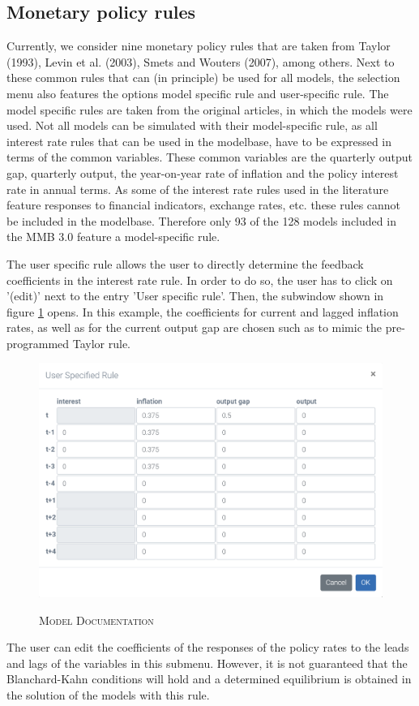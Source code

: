 \subsection*{Monetary policy rules}
Currently, we consider nine monetary policy rules that are taken from Taylor (1993), Levin et al. (2003), Smets and Wouters (2007), among others. Next to these common rules that can (in principle) be used for all models, the selection menu also features the options model specific rule and user-specific rule. 
The model specific rules are taken from the original articles, in which the models were used. Not all models can be simulated with their model-specific rule, as all interest rate rules that can be used in the modelbase, have to be expressed in terms of the common variables. These common variables are the quarterly output gap, quarterly output, the year-on-year rate of inflation and the policy interest rate in annual terms. As some of the interest rate rules used in the literature feature responses to financial indicators, exchange rates, etc. these rules cannot be included in the modelbase. Therefore only 93 of the 128 models included in the MMB 3.0 feature a model-specific rule.

The user specific rule allows the user to directly determine the feedback coefficients in the interest rate rule. In order to do so, the user has to click on '(edit)' next to the entry 'User specific rule'. Then, the subwindow shown in figure \ref{userrule} opens. In this example, the coefficients for current and lagged inflation rates, as well as for the current output gap are chosen such as to mimic the pre-programmed Taylor rule. 
\begin{figure}[H]
	\centering
	\caption{\textsc{Model Documentation}}
	\vspace{0.2cm}
	\includegraphics[width=15cm,keepaspectratio]{userrule.png}\\
	\label{userrule}
\end{figure}
The user can edit the coefficients of the responses of the policy rates to the leads and lags of the variables in this submenu. However, it is not guaranteed that the Blanchard-Kahn conditions will hold and a determined equilibrium is obtained in the solution of the models with this rule. 


